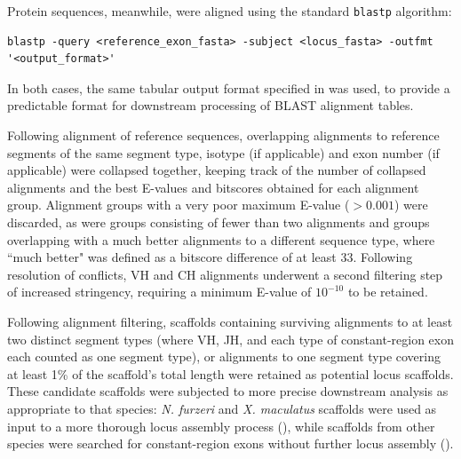 Protein sequences, meanwhile, were aligned using the standard \lstinline{blastp} algorithm:

\begin{lstlisting}
blastp -query <reference_exon_fasta> -subject <locus_fasta> -outfmt '<output_format>'
\end{lstlisting}

In both cases, the same tabular output format specified in  was used, to provide a predictable format for downstream processing of BLAST alignment tables.

Following alignment of reference sequences, overlapping alignments to reference segments of the same segment type, isotype (if applicable) and exon number (if applicable) were collapsed together, keeping track of the number of collapsed alignments and the best E-values and bitscores obtained for each alignment group. Alignment groups with a very poor maximum E-value ($> 0.001$) were discarded, as were groups consisting of fewer than two alignments and groups overlapping with a much better alignments to a different sequence type, where ``much better" was defined as a bitscore difference of at least 33. Following resolution of conflicts, VH and CH alignments underwent a second filtering step of increased stringency, requiring a minimum E-value of $10^{-10}$ to be retained. 

Following alignment filtering, scaffolds containing surviving alignments to at least two distinct segment types (where VH, JH, and each type of constant-region exon each counted as one segment type), or alignments to one segment type covering at least 1\% of the scaffold's total length were retained as potential locus scaffolds. These candidate scaffolds were subjected to more precise downstream analysis as appropriate to that species: \textit{N. furzeri} and \textit{X. maculatus} scaffolds were used as input to a more thorough locus assembly process (), while scaffolds from other species were searched for constant-region exons without further locus assembly ().

